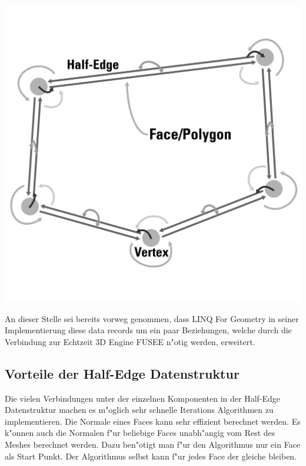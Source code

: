 \documentclass[pagesize, paper=a4, fontsize=12pt,titlepage=true, headings=small, headnosepline, abstractoff, liststotoc, nochapterprefix, plainheadsepline]{scrreprt}
\newcommand{\LFGS}{LINQ For Geometry }
\newcommand{\HES}{Half-Edge Datenstruktur }
\begin{document}
\includegraphics[width=\linewidth]{../Bilder/hesBeziehungen}
\label{pic:polyConnections} 

An dieser Stelle sei bereits vorweg genommen, dass \LFGS in seiner Implementierung diese data records um ein paar Beziehungen, welche durch die Verbindung zur Echtzeit 3D Engine FUSEE n"otig werden, erweitert.

		\subsection {Vorteile der \HES}
			Die vielen Verbindungen unter der einzelnen Komponenten in der \HES machen es m"oglich sehr schnelle Iterations Algorithmen zu implementieren. Die Normale eines Faces kann sehr effizient berechnet werden. Es k"onnen auch die Normalen f"ur beliebige Faces unabh"angig vom Rest des Meshes berechnet werden. Dazu ben"otigt man f"ur den Algorithmus nur ein Face als Start Punkt. Der Algorithmus selbst kann f"ur jedes Face der gleiche bleiben.
\end{document}
